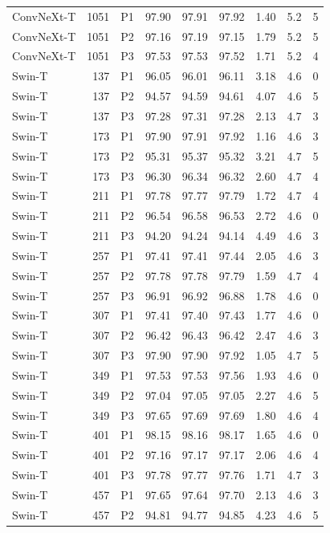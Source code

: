 {\begin{longtable}{lrlrrrrrr}
ConvNeXt-T & 1051 & P1 & 97.90 & 97.91 & 97.92 & 1.40 & 5.2 & 5 \\
ConvNeXt-T & 1051 & P2 & 97.16 & 97.19 & 97.15 & 1.79 & 5.2 & 5 \\
ConvNeXt-T & 1051 & P3 & 97.53 & 97.53 & 97.52 & 1.71 & 5.2 & 4 \\
Swin-T & 137 & P1 & 96.05 & 96.01 & 96.11 & 3.18 & 4.6 & 0 \\
Swin-T & 137 & P2 & 94.57 & 94.59 & 94.61 & 4.07 & 4.6 & 5 \\
Swin-T & 137 & P3 & 97.28 & 97.31 & 97.28 & 2.13 & 4.7 & 3 \\
Swin-T & 173 & P1 & 97.90 & 97.91 & 97.92 & 1.16 & 4.6 & 3 \\
Swin-T & 173 & P2 & 95.31 & 95.37 & 95.32 & 3.21 & 4.7 & 5 \\
Swin-T & 173 & P3 & 96.30 & 96.34 & 96.32 & 2.60 & 4.7 & 4 \\
Swin-T & 211 & P1 & 97.78 & 97.77 & 97.79 & 1.72 & 4.7 & 4 \\
Swin-T & 211 & P2 & 96.54 & 96.58 & 96.53 & 2.72 & 4.6 & 0 \\
Swin-T & 211 & P3 & 94.20 & 94.24 & 94.14 & 4.49 & 4.6 & 3 \\
Swin-T & 257 & P1 & 97.41 & 97.41 & 97.44 & 2.05 & 4.6 & 3 \\
Swin-T & 257 & P2 & 97.78 & 97.78 & 97.79 & 1.59 & 4.7 & 4 \\
Swin-T & 257 & P3 & 96.91 & 96.92 & 96.88 & 1.78 & 4.6 & 0 \\
Swin-T & 307 & P1 & 97.41 & 97.40 & 97.43 & 1.77 & 4.6 & 0 \\
Swin-T & 307 & P2 & 96.42 & 96.43 & 96.42 & 2.47 & 4.6 & 3 \\
Swin-T & 307 & P3 & 97.90 & 97.90 & 97.92 & 1.05 & 4.7 & 5 \\
Swin-T & 349 & P1 & 97.53 & 97.53 & 97.56 & 1.93 & 4.6 & 0 \\
Swin-T & 349 & P2 & 97.04 & 97.05 & 97.05 & 2.27 & 4.6 & 5 \\
Swin-T & 349 & P3 & 97.65 & 97.69 & 97.69 & 1.80 & 4.6 & 4 \\
Swin-T & 401 & P1 & 98.15 & 98.16 & 98.17 & 1.65 & 4.6 & 0 \\
Swin-T & 401 & P2 & 97.16 & 97.17 & 97.17 & 2.06 & 4.6 & 4 \\
Swin-T & 401 & P3 & 97.78 & 97.77 & 97.76 & 1.71 & 4.7 & 3 \\
Swin-T & 457 & P1 & 97.65 & 97.64 & 97.70 & 2.13 & 4.6 & 3 \\
Swin-T & 457 & P2 & 94.81 & 94.77 & 94.85 & 4.23 & 4.6 & 5 \\

\end{longtable}}

